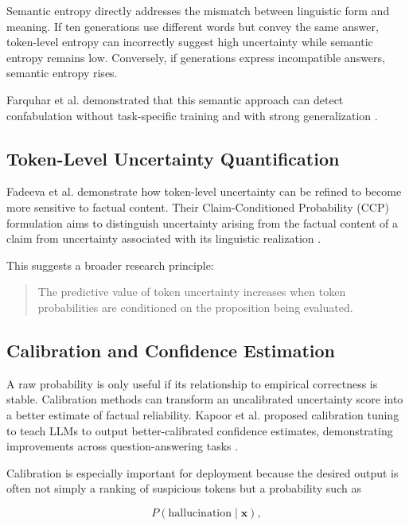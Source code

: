 \documentclass[11pt]{article}
\begin{document}
Semantic entropy directly addresses the mismatch between linguistic form and meaning. If ten generations use different words but convey the same answer, token-level entropy can incorrectly suggest high uncertainty while semantic entropy remains low. Conversely, if generations express incompatible answers, semantic entropy rises.

Farquhar et al. demonstrated that this semantic approach can detect confabulation without task-specific training and with strong generalization \cite{farquhar2024}.

\subsection{Token-Level Uncertainty Quantification}
\label{sec:token-quantification}

Fadeeva et al. demonstrate how token-level uncertainty can be refined to become more sensitive to factual content. Their Claim-Conditioned Probability (CCP) formulation aims to distinguish uncertainty arising from the factual content of a claim from uncertainty associated with its linguistic realization \cite{fadeeva2024}.

This suggests a broader research principle:

\begin{quote}
The predictive value of token uncertainty increases when token probabilities are conditioned on the proposition being evaluated.
\end{quote}

\subsection{Calibration and Confidence Estimation}
\label{sec:calibration}

A raw probability is only useful if its relationship to empirical correctness is stable. Calibration methods can transform an uncalibrated uncertainty score into a better estimate of factual reliability. Kapoor et al. proposed calibration tuning to teach LLMs to output better-calibrated confidence estimates, demonstrating improvements across question-answering tasks \cite{kapoor2024}.

Calibration is especially important for deployment because the desired output is often not simply a ranking of suspicious tokens but a probability such as

\begin{equation}
P(\mathrm{hallucination}\mid\mathbf{x}),
\label{eq:hallucination-probability}
\end{equation}
\end{document}
